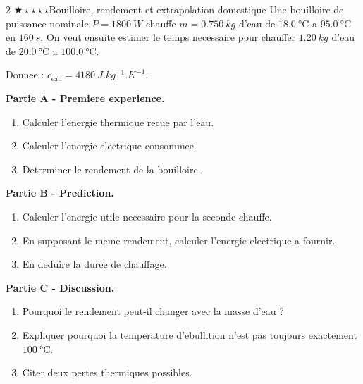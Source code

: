 \documentclass[11pt,a4paper]{article}
\newcommand{\diffone}{\(\bigstar\star\star\star\star\)}
\begin{document}
\begin{probleme}{2 \diffone}{Bouilloire, rendement et extrapolation domestique}
Une bouilloire de puissance nominale \(P=\SI{1800}{W}\) chauffe \(m=\SI{0.750}{kg}\) d'eau de \(\SI{18.0}{\celsius}\) a \(\SI{95.0}{\celsius}\) en \(\SI{160}{s}\). On veut ensuite estimer le temps necessaire pour chauffer \(\SI{1.20}{kg}\) d'eau de \(\SI{20.0}{\celsius}\) a \(\SI{100.0}{\celsius}\).

Donnee : \(c_{\text{eau}}=\SI{4180}{J.kg^{-1}.K^{-1}}\).

\textbf{Partie A - Premiere experience.}
\begin{enumerate}
\item Calculer l'energie thermique recue par l'eau.
\item Calculer l'energie electrique consommee.
\item Determiner le rendement de la bouilloire.
\end{enumerate}

\textbf{Partie B - Prediction.}
\begin{enumerate}[resume]
\item Calculer l'energie utile necessaire pour la seconde chauffe.
\item En supposant le meme rendement, calculer l'energie electrique a fournir.
\item En deduire la duree de chauffage.
\end{enumerate}

\textbf{Partie C - Discussion.}
\begin{enumerate}[resume]
\item Pourquoi le rendement peut-il changer avec la masse d'eau ?
\item Expliquer pourquoi la temperature d'ebullition n'est pas toujours exactement \(\SI{100}{\celsius}\).
\item Citer deux pertes thermiques possibles.
\end{enumerate}
\end{probleme}
\end{document}

